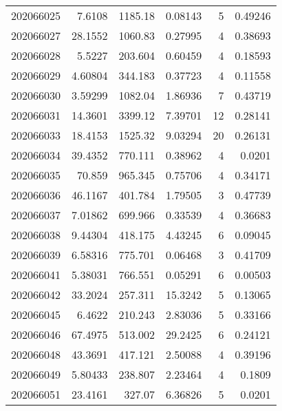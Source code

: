 \begin{tabular}{rrrrrr}
 202066025 &          7.6108  &     1185.18   &            0.08143 &           5 & 0.49246 \\
 202066027 &         28.1552  &     1060.83   &            0.27995 &           4 & 0.38693 \\
 202066028 &          5.5227  &      203.604  &            0.60459 &           4 & 0.18593 \\
 202066029 &          4.60804 &      344.183  &            0.37723 &           4 & 0.11558 \\
 202066030 &          3.59299 &     1082.04   &            1.86936 &           7 & 0.43719 \\
 202066031 &         14.3601  &     3399.12   &            7.39701 &          12 & 0.28141 \\
 202066033 &         18.4153  &     1525.32   &            9.03294 &          20 & 0.26131 \\
 202066034 &         39.4352  &      770.111  &            0.38962 &           4 & 0.0201  \\
 202066035 &         70.859   &      965.345  &            0.75706 &           4 & 0.34171 \\
 202066036 &         46.1167  &      401.784  &            1.79505 &           3 & 0.47739 \\
 202066037 &          7.01862 &      699.966  &            0.33539 &           4 & 0.36683 \\
 202066038 &          9.44304 &      418.175  &            4.43245 &           6 & 0.09045 \\
 202066039 &          6.58316 &      775.701  &            0.06468 &           3 & 0.41709 \\
 202066041 &          5.38031 &      766.551  &            0.05291 &           6 & 0.00503 \\
 202066042 &         33.2024  &      257.311  &           15.3242  &           5 & 0.13065 \\
 202066045 &          6.4622  &      210.243  &            2.83036 &           5 & 0.33166 \\
 202066046 &         67.4975  &      513.002  &           29.2425  &           6 & 0.24121 \\
 202066048 &         43.3691  &      417.121  &            2.50088 &           4 & 0.39196 \\
 202066049 &          5.80433 &      238.807  &            2.23464 &           4 & 0.1809  \\
 202066051 &         23.4161  &      327.07   &            6.36826 &           5 & 0.0201  \\

\end{tabular}
